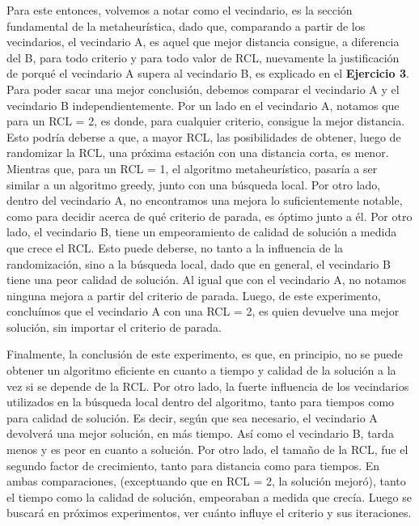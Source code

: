 Para este entonces, volvemos a notar como el vecindario, es la sección fundamental de la metaheurística, dado que, comparando a partir de los vecindarios, el vecindario A, es aquel que mejor distancia consigue, a diferencia del B, para todo criterio y para todo valor de RCL, nuevamente la justificación de porqué el vecindario A supera al vecindario B, es explicado en el \textbf{Ejercicio 3}. Para poder sacar una mejor conclusión, debemos comparar el vecindario A y el vecindario B independientemente.
Por un lado en el vecindario A, notamos que para un RCL = 2, es donde, para cualquier criterio, consigue la mejor distancia. Esto podría deberse a que, a mayor RCL, las posibilidades de obtener, luego de randomizar la RCL, una próxima estación con una distancia corta, es menor. Mientras que, para un RCL = 1, el algoritmo metaheurístico, pasaría a ser similar a un algoritmo greedy, junto con una búsqueda local. Por otro lado, dentro del vecindario A, no encontramos una mejora lo suficientemente notable, como para decidir acerca de qué criterio de parada, es óptimo junto a él. Por otro lado, el vecindario B, tiene un empeoramiento de calidad de solución a medida que crece el RCL. Esto puede deberse, no tanto a la influencia de la randomización, sino a la búsqueda local, dado que en general, el vecindario B tiene una peor calidad de solución. Al igual que con el vecindario A, no notamos ninguna mejora a partir del criterio de parada. Luego, de este experimento, concluímos que el vecindario A con una RCL = 2, es quien devuelve una mejor solución, sin importar el criterio de parada.


\par Finalmente, la conclusión de este experimento, es que, en principio, no se puede obtener un algoritmo eficiente en cuanto a tiempo y calidad de la solución a la vez si se depende de la RCL. Por otro lado, la fuerte influencia de los vecindarios utilizados en la búsqueda local dentro del algoritmo, tanto para tiempos como para calidad de solución. Es decir, según que sea necesario, el vecindario A devolverá una mejor solución, en más tiempo. Así como el vecindario B, tarda menos y es peor en cuanto a solución. Por otro lado, el tamaño de la RCL, fue el segundo factor de crecimiento, tanto para distancia como para tiempos. En ambas comparaciones, (exceptuando que en RCL = 2, la solución mejoró), tanto el tiempo como la calidad de solución, empeoraban a medida que crecía. Luego se buscará en próximos experimentos, ver cuánto influye el criterio y sus iteraciones.



